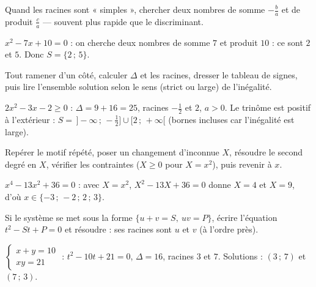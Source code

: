Quand les racines sont « simples », chercher deux nombres de somme $-\frac{b}{a}$
et de produit $\frac{c}{a}$ — souvent plus rapide que le discriminant.
\begin{exemple}
$x^2-7x+10=0$ : on cherche deux nombres de somme $7$ et produit $10$ : ce sont $2$
et $5$. Donc $S=\{2\,;\,5\}$.
\end{exemple}

Tout ramener d'un côté, calculer $\Delta$ et les racines, dresser le tableau de
signes, puis lire l'ensemble solution selon le sens (strict ou large) de l'inégalité.
\begin{exemple}
$2x^2-3x-2\ge 0$ : $\Delta=9+16=25$, racines $-\frac{1}{2}$ et $2$, $a>0$. Le trinôme
est positif à l'extérieur : $S=\,\big]-\infty\,;\,-\tfrac{1}{2}\big]\cup[2\,;\,+\infty[$
(bornes incluses car l'inégalité est large).
\end{exemple}

Repérer le motif répété, poser un changement d'inconnue $X$, résoudre le second
degré en $X$, vérifier les contraintes ($X\ge 0$ pour $X=x^2$), puis revenir à $x$.
\begin{exemple}
$x^4-13x^2+36=0$ : avec $X=x^2$, $X^2-13X+36=0$ donne $X=4$ et $X=9$, d'où
$x\in\{-3\,;\,-2\,;\,2\,;\,3\}$.
\end{exemple}

Si le système se met sous la forme $\{u+v=S,\ uv=P\}$, écrire l'équation
$t^2-St+P=0$ et résoudre : ses racines sont $u$ et $v$ (à l'ordre près).
\begin{exemple}
$\begin{cases} x+y=10\\ xy=21 \end{cases}$ : $t^2-10t+21=0$, $\Delta=16$, racines
$3$ et $7$. Solutions : $(3\,;\,7)$ et $(7\,;\,3)$.
\end{exemple}
